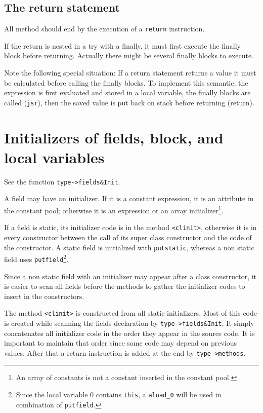 \documentclass{book}
\newcommand{\jinst}[1]{\verb+#1+}
\begin{document}
\subsection{The return statement}

All method should end by the execution of a \jinst{return} instruction.

If the return is nested in a try with a finally, it must first execute
the finally block before returning. Actually there might be several
finally blocks to execute. 

Note the following special situation: If a return statement returns a
value it must be calculated before calling the finally blocks. To
implement this semantic, the expression is first evaluated and stored
in a local variable, the finally blocks are called (\jinst{jsr}), then the
saved value is put back on stack before returning (return).

\section{Initializers of fields, block, and local variables}

See the function \verb+type->fields&Init+.

A field may have an initializer. If it is a constant expression, it is
an attribute in the constant pool; otherwise it is an expression or an
array initializer\footnote{An array of constants is not a constant
inserted in the constant pool.}.

If a field is static, its initializer code is in the method
\verb+<clinit>+, otherwise it is in every constructor between the call
of its super class constructor and the code of the constructor. A
static field is initialized with \verb+putstatic+, whereas a non
static field uses \verb+putfield+\footnote{Since the local variable 0
contains \verb+this+, a \verb+aload_0+ will be used in combination of
\verb+putfield+.}.

Since a non static field with an initializer may appear after a class
constructor, it is easier to scan all fields before the methods to
gather the initializer codes to insert in the constructors.

The method \verb+<clinit>+ is constructed from all static
initializers. Most of this code is created while scanning the fields
declaration by \verb+type->fields&Init+. It simply concatenates all
initializer code in the order they appear in the source code. It is
important to maintain that order since some code may depend on
previous values. After that a return instruction is added at the end
by \verb+type->methods+.
\end{document}
